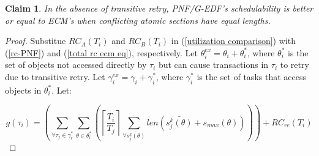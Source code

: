 \documentclass[12pt,english]{report}
\newtheorem{clm}{Claim}
\newtheorem{proof}{Proof}
\begin{document}
\begin{clm}\label{PNF ecf comaprison clm}
In the absence of transitive retry, PNF/G-EDF's schedulability is better or equal to ECM's when conflicting atomic sections have equal lengths.
\end{clm}
\begin{proof}\normalfont
Substitue $RC_{A}(T_{i})$ and $RC_{B}(T_{i})$ in (\ref{utilization comparison})
with (\ref{rc-PNF}) and (\ref{total rc ecm eq}), respectively. Let $\theta_{i}^{ex}=\theta_{i}+\theta_{i}^{*}$, where $\theta_{i}^{*}$
is the set of objects not accessed directly by $\tau_{i}$ but can
cause transactions in $\tau_{i}$ to retry due to transitive retry.
Let $\gamma_{i}^{ex}=\gamma_{i}+\gamma_{i}^{*}$, where $\gamma_{i}^{*}$
is the set of tasks that access objects in $\theta_{i}^{*}$.
Let:
%

\begin{equation*}
g(\tau_{i}) = \left(\sum_{\forall\tau_{j}\in\gamma_{i}^{*}}\sum_{\theta\in\theta_{i}^{*}}\left(\left\lceil \frac{T_{i}}{T_{j}}\right\rceil \sum_{\forall\bar{s_{j}^{k}(\theta)}}len\left(\bar{s_{j}^{k}(\theta)} + s_{max}(\theta)\right)\right)\right)+RC_{re}(T_{i})
\end{equation*}


\end{proof}
\end{document}
